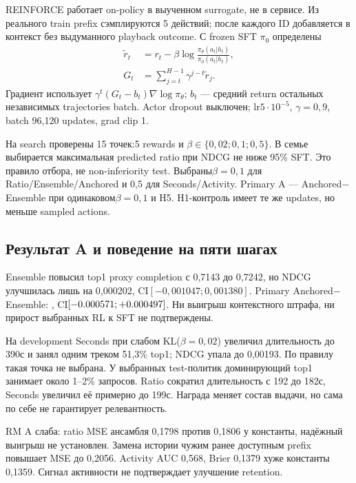 \documentclass[10pt,a4paper,twocolumn]{article}
\begin{document}
REINFORCE работает on-policy в выученном surrogate, не в сервисе.
Из реального train prefix сэмплируются 5 действий; после каждого ID
добавляется в контекст без выдуманного playback outcome.
С frozen SFT $\pi_0$ определены
\begin{align}
\widetilde r_t&=r_t-\beta\log\frac{\pi_\theta(a_t|h_t)}{\pi_0(a_t|h_t)},\\
G_t&=\sum_{j=t}^{H-1}\gamma^{j-t}\widetilde r_j.
\end{align}
Градиент использует $\gamma^t(G_t-b_t)\nabla\log\pi_\theta$;
$b_t$ --- средний return остальных независимых trajectories batch.
Actor dropout выключен; lr$5\cdot10^{-5}$, $\gamma=0{,}9$,
batch 96{,}120 updates, grad clip 1.

На search проверены 15 точек:5 rewards и
$\beta\in\{0{,}02;0{,}1;0{,}5\}$. В семье выбирается максимальная predicted ratio
при NDCG не ниже 95\% SFT. Это правило отбора, не non-inferiority test.
Выбраны$\beta=0{,}1$ для Ratio/Ensemble/Anchored и 0{,}5 для Seconds/Activity.
Primary A --- Anchored$-$Ensemble при одинаковом$\beta=0{,}1$ и H5.
H1-контроль имеет те же updates, но меньше sampled actions.

\subsection{Результат A и поведение на пяти шагах}
\begin{table}[t]
\centering\small\setlength{\tabcolsep}{3pt}
\caption{Внешний test A: \AUsers{} активных UID, \AQueries{} запросов.
Это среднее трёх отдельных policy fits, не ансамбль политик.}
\label{tab:a}
\end{table}

Ensemble повысил top1 proxy completion с 0{,}7143 до 0{,}7242,
но NDCG улучшилась лишь на 0{,}000202, CI$[-0{,}001047;0{,}001380]$.
Primary Anchored$-$Ensemble: \ADelta{}, CI$[-0.000571;+0.000497]$.
Ни выигрыш контекстного штрафа, ни прирост выбранных RL к SFT не подтверждены.

На development Seconds при слабом KL($\beta=0{,}02$) увеличил
длительность до 390с и занял одним треком 51{,}3\% top1;
NDCG упала до 0{,}00193. По правилу такая точка не выбрана.
У выбранных test-политик доминирующий top1 занимает около 1--2\% запросов.
Ratio сократил длительность с 192 до 182с, Seconds увеличил её примерно до 199с.
Награда меняет состав выдачи, но сама по себе не гарантирует релевантность.

RM A слаба: ratio MSE ансамбля 0{,}1798 против 0{,}1806 у константы,
надёжный выигрыш не установлен. Замена истории чужим ранее доступным
prefix повышает MSE до 0{,}2056. Activity AUC 0{,}568, Brier 0{,}1379 хуже
константы 0{,}1359. Сигнал активности не подтверждает улучшение retention.
\end{document}
